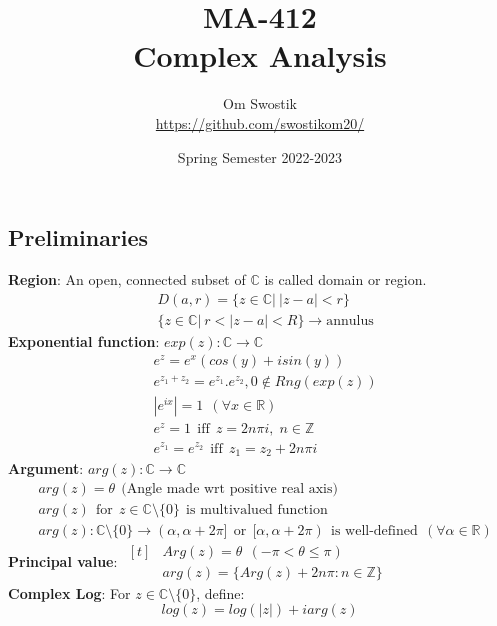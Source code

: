 \documentclass{article}
\title{\textbf{MA-412}\\ \textbf{Complex Analysis}}
\author{Om Swostik\\\url{https://github.com/swostikom20/}}
\date{Spring Semester 2022-2023}
\begin{document}
\maketitle
\clearpage
\begin{flushleft}
\section{Preliminaries}
\textbf{Region}: An open, connected subset of $\mathds{C}$ is called domain or region.
\begin{align}
&D(a,r)=\{z\in \mathds{C}|\: |z-a|<r\} \nonumber\\
&\{z\in \mathds{C}|\:r<|z-a|<R\}  \rightarrow \text{annulus} \nonumber
\end{align}
\textbf{Exponential function}: $exp(z):\mathds{C}\rightarrow\mathds{C}$
\begin{align}
&e^z=e^x(cos(y)+isin(y))\nonumber\\
&e^{z_1+z_2}=e^{z_1}.e^{z_2},  0\notin Rng(exp(z))\nonumber\\
&|e^{ix}|=1  \:\: (\forall x\in \mathds{R})\nonumber\\
&e^{z}=1 \:\:\text{iff} \:\: z=2n\pi i\text{,} \:\: n\in \mathds{Z}\nonumber\\
&e^{z_1}=e^{z_2} \:\:\text{iff}\:\: z_1=z_2+2n\pi i\nonumber
\end{align}
\textbf{Argument}: $arg(z):\mathds{C}\rightarrow\mathds{C}$
\begin{align}
&arg(z)=\theta \:\:\text{(Angle made wrt positive real axis)} \nonumber\\
&arg(z) \:\:\text{for} \:\: z\in \mathds{C}\setminus \{0\} \:\:\text{is multivalued function} \nonumber\\
&arg(z): \mathds{C}\setminus \{0\}\rightarrow (\alpha,\alpha+2\pi] \:\:\text{or}\:\: [\alpha,\alpha+2\pi) \:\:\text{is well-defined}\:\: (\forall \alpha \in \mathds{R})\nonumber
\end{align} 
\textbf{Principal value}: 
$\begin{aligned}[t] 
&Arg(z)=\theta  \:\: (-\pi<\theta\leq \pi)\\ &arg(z)=\{Arg(z)+2n\pi:n\in \mathds{Z}\}
\end{aligned}$ \:\:
\\
\vspace{5mm}
\textbf{Complex Log}: For $z\in \mathds{C}\setminus \{0\}$, define: \begin{equation} log(z)=log(|z|)+ iarg(z) \nonumber \end{equation} 

\end{flushleft}
\end{document}
